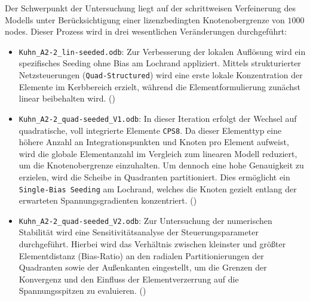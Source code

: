 Der Schwerpunkt der Untersuchung liegt auf der schrittweisen Verfeinerung des Modells unter Berücksichtigung einer lizenzbedingten Knotenobergrenze von ${1000}$ nodes. Dieser Prozess wird in drei wesentlichen Veränderungen durchgeführt:
\begin{itemize}
    \item \texttt{Kuhn\_A2-2\_lin-seeded.odb}: Zur Verbesserung der lokalen Auflösung wird ein spezifisches Seeding ohne Bias am Lochrand appliziert. Mittels strukturierter Netzsteuerungen (\texttt{Quad-Structured}) wird eine erste lokale Konzentration der Elemente im Kerbbereich erzielt, während die Elementformulierung zunächst linear beibehalten wird. ()
    \item \texttt{Kuhn\_A2-2\_quad-seeded\_V1.odb}: In dieser Iteration erfolgt der Wechsel auf quadratische, voll integrierte Elemente \texttt{CPS8}. Da dieser Elementtyp eine höhere Anzahl an Integrationspunkten und Knoten pro Element aufweist, wird die globale Elementanzahl im Vergleich zum linearen Modell reduziert, um die Knotenobergrenze einzuhalten. Um dennoch eine hohe Genauigkeit zu erzielen, wird die Scheibe in Quadranten partitioniert. Dies ermöglicht ein \texttt{Single-Bias Seeding} am Lochrand, welches die Knoten gezielt entlang der erwarteten Spannungsgradienten konzentriert. ()
    \item \texttt{Kuhn\_A2-2\_quad-seeded\_V2.odb}: Zur Untersuchung der numerischen Stabilität wird eine Sensitivitätsanalyse der Steuerungsparameter durchgeführt. Hierbei wird das Verhältnis zwischen kleinster und größter Elementdistanz (Bias-Ratio) an den radialen Partitionierungen der Quadranten sowie der Außenkanten eingestellt, um die Grenzen der Konvergenz und den Einfluss der Elementverzerrung auf die Spannungsspitzen zu evaluieren. ()
\end{itemize}

